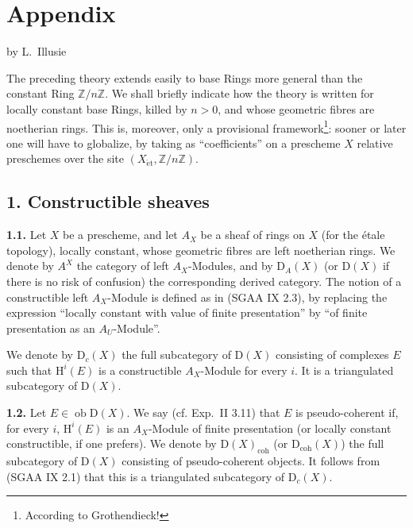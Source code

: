 \documentclass[11pt]{article}
\renewcommand{\H}{\mathrm{H}}
\newcommand{\D}{\mathrm{D}}
\newcommand{\Z}{\mathbb{Z}}
\newcommand{\ob}{\operatorname{ob}}
\providecommand{\ob}{\operatorname{ob}}
\providecommand{\Z}{\mathbb Z}
\begin{document}
\section*{Appendix}
\begin{center}
by L.~Illusie
\end{center}

The preceding theory extends easily to base Rings more general than the constant Ring $\Z/n\Z$. We shall briefly indicate how the theory is written for locally constant base Rings, killed by $n>0$, and whose geometric fibres are noetherian rings. This is, moreover, only a provisional framework\footnote{According to Grothendieck!}: sooner or later one will have to globalize, by taking as ``coefficients'' on a prescheme $X$ relative preschemes over the site $(X_{\mathrm{\acute et}},\Z/n\Z)$.

\subsection*{1. Constructible sheaves}

\textbf{1.1.} Let $X$ be a prescheme, and let $A_X$ be a sheaf of rings on $X$ (for the étale topology), locally constant, whose geometric fibres are left noetherian rings. We denote by $A^{X}$ the category of left $A_X$-Modules, and by $\D_A(X)$ (or $\D(X)$ if there is no risk of confusion) the corresponding derived category. The notion of a constructible left $A_X$-Module is defined as in (SGAA IX 2.3), by replacing the expression ``locally constant with value of finite presentation'' by ``of finite presentation as an $A_U$-Module''.

We denote by $\D_c(X)$ the full subcategory of $\D(X)$ consisting of complexes $E$ such that $\H^i(E)$ is a constructible $A_X$-Module for every $i$. It is a triangulated subcategory of $\D(X)$.

\textbf{1.2.} Let $E\in\ob\D(X)$. We say (cf. Exp.~II 3.11) that $E$ is pseudo-coherent if, for every $i$, $\H^i(E)$ is an $A_X$-Module of finite presentation (or locally constant constructible, if one prefers). We denote by $\D(X)_{\mathrm{coh}}$ (or $\D_{\mathrm{coh}}(X)$) the full subcategory of $\D(X)$ consisting of pseudo-coherent objects. It follows from (SGAA IX 2.1) that this is a triangulated subcategory of $\D_c(X)$.
\end{document}
